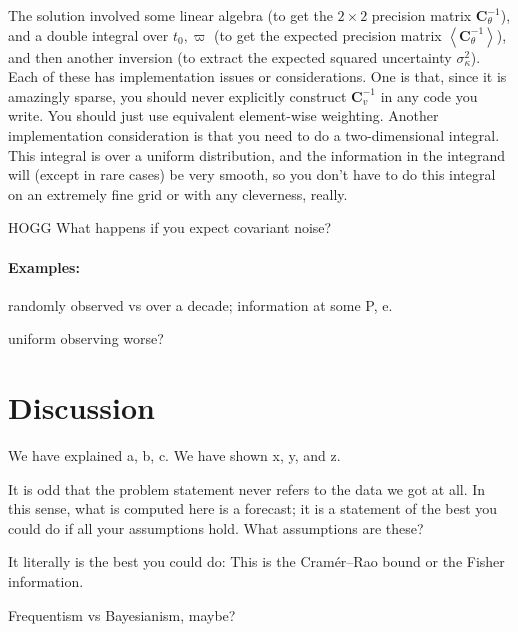 \documentclass[10pt, letterpaper]{article}
\newcommand{\inv}{^{-1}}
\newcommand{\mean}[1]{\left<{#1}\right>}
\newcommand{\tensor}[1]{\mathbf{#1}}
\newcommand{\tC}{\tensor{C}}
\begin{document}
The solution involved some linear algebra (to get the $2\times 2$
precision matrix $\tC_\theta\inv$), and a double integral over $t_0,
\varpi$ (to get the expected precision matrix
$\mean{\tC_\theta\inv}$), and then another inversion (to extract the
expected squared uncertainty $\sigma^2_\kappa$). Each of these has
implementation issues or considerations. One is that, since it
is amazingly sparse, you should never explicitly construct $\tC_v\inv$
in any code you write. You should just use equivalent element-wise
weighting.
Another implementation consideration is that you need to do a two-dimensional
integral. This integral is over a uniform distribution, and the information
in the integrand will (except in rare cases) be very smooth, so you don't
have to do this integral on an extremely fine grid or with any cleverness,
really.

HOGG What happens if you expect covariant noise?

\paragraph{Examples:}
randomly observed vs over a decade; information at some P, e.

uniform observing worse?

\section{Discussion}\label{sec:discussion}

We have explained a, b, c. We have shown x, y, and z.

It is odd that the problem statement never refers to the data we got at all.
In this sense, what is computed here is a forecast; it is a statement of the
best you could do if all your assumptions hold. What assumptions are these?

It literally is the best you could do:
This is the Cram\'er--Rao bound or the Fisher information.

Frequentism vs Bayesianism, maybe?

\clearmargin\clearpage\raggedright

\end{document}
